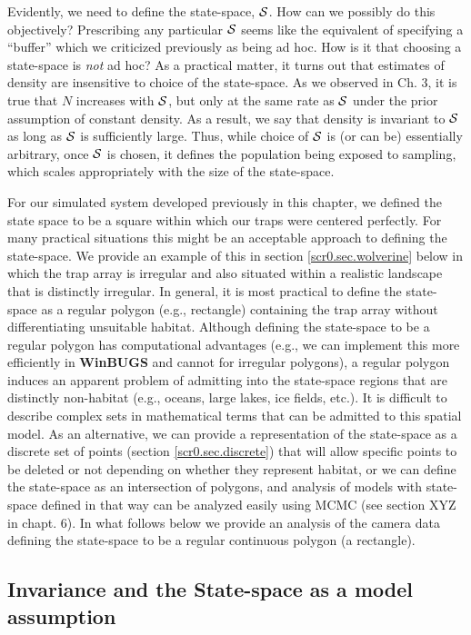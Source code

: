 Evidently, we need to define the state-space, ${\cal S}$. How can we possibly
do this objectively? Prescribing any particular ${\cal S}$ seems like the
equivalent of specifying a ``buffer'' which we criticized previously
as being ad hoc. How is it that choosing a state-space is {\it not} ad
hoc? As a practical matter, it turns out that estimates of density are
insensitive to choice of the state-space. As we observed in Ch. 3, 
it is true that $N$ increases with ${\cal S}$, but only at the same
rate as ${\cal S}$
under the prior assumption of constant density. As a result, we say
that density is invariant to ${\cal S}$ as long as ${\cal S}$ is sufficiently
large. Thus, while choice of ${\cal S}$ is (or can be) essentially arbitrary,
once ${\cal S}$ is chosen, it defines the population being exposed to sampling,
which scales appropriately with the size of the state-space.

For our simulated system developed previously in this chapter, we
defined the state space to be a square within which our traps were
centered perfectly. For many practical situations this might be an
acceptable approach to defining the state-space. We provide an example
of this in section \ref{scr0.sec.wolverine} below in which the trap array is
irregular and also situated within a realistic landscape that is
distinctly irregular.  In general, it is most practical to define the
state-space as a regular polygon (e.g., rectangle) containing the trap
array without differentiating unsuitable habitat. Although defining
the state-space to be a regular polygon has computational advantages
(e.g., we can implement this more efficiently in {\bf WinBUGS} and
cannot for irregular polygons), a regular polygon induces an apparent
problem of admitting into the state-space regions that are distinctly
non-habitat (e.g., oceans, large lakes, ice fields, etc.).  It is
difficult to describe complex sets in mathematical terms that can be
admitted to this spatial model. As an alternative, we can provide a
representation of the state-space as a discrete set of points (section
\ref{scr0.sec.discrete}) that will allow specific points to be deleted
or not depending on whether they represent habitat, or we can define
the state-space as an intersection of polygons, and analysis of models
with state-space defined in that way can be analyzed easily using MCMC
(see section XYZ in chapt. 6).  In what follows below we provide an
analysis of the camera data defining the state-space to be a regular
continuous polygon (a rectangle).


\subsection{Invariance and the State-space as a model assumption}

